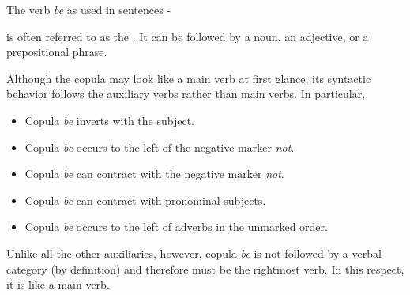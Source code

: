 The verb {\it be} as used in sentences {}-{ is often
referred to as the .  It can be followed by a noun,
an adjective, or a prepositional phrase.


Although the copula may look like a main verb at first glance, its syntactic
behavior follows the auxiliary verbs rather than main verbs.  In particular,

\begin{itemize}
\item Copula {\it be} inverts with the subject.

\item Copula {\it be} occurs to the left of the negative marker {\it
not}.

\item Copula {\it be} can contract with the negative marker {\it not}.

\item Copula {\it be} can contract with pronominal subjects.

\item Copula {\it be} occurs to the left of adverbs in the unmarked order.
\end{itemize}

Unlike all the other auxiliaries, however, copula {\it be} is not followed by
a verbal category (by definition) and therefore must be the rightmost verb.  In
this respect, it is like a main verb.

}
